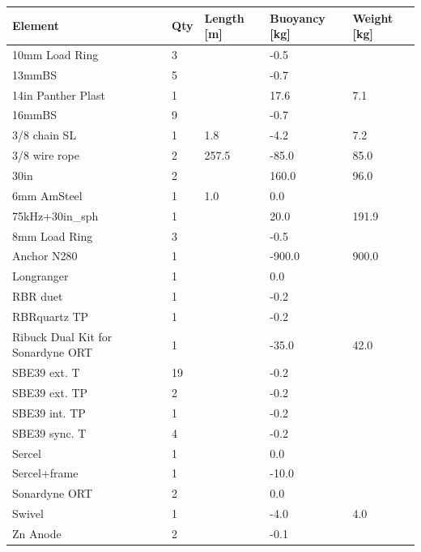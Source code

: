 \documentclass{article}
\begin{document}
\begin{tabularx}{\linewidth}{|l|l|l|l|l|}
\caption{N280 \textcolor{red}{$\blacksquare$}: Element summary}\\
\hline
\textbf{Element} & \textbf{Qty} & \textbf{Length [m]} & \textbf{Buoyancy [kg]} & \textbf{Weight [kg]} \\
\hline
10mm Load Ring & 3 &  & -0.5 &  \\ \hline
13mmBS & 5 &  & -0.7 &  \\ \hline
14in Panther Plast & 1 &  & 17.6 & 7.1 \\ \hline
16mmBS & 9 &  & -0.7 &  \\ \hline
3/8 chain SL & 1 & 1.8 & -4.2 & 7.2 \\ \hline
3/8 wire rope & 2 & 257.5 & -85.0 & 85.0 \\ \hline
30in & 2 &  & 160.0 & 96.0 \\ \hline
6mm AmSteel & 1 & 1.0 & 0.0 &  \\ \hline
75kHz+30in\_sph & 1 &  & 20.0 & 191.9 \\ \hline
8mm Load Ring & 3 &  & -0.5 &  \\ \hline
Anchor N280 & 1 &  & -900.0 & 900.0 \\ \hline
Longranger & 1 &  & 0.0 &  \\ \hline
RBR duet & 1 &  & -0.2 &  \\ \hline
RBRquartz TP & 1 &  & -0.2 &  \\ \hline
Ribuck Dual Kit for Sonardyne ORT & 1 &  & -35.0 & 42.0 \\ \hline
SBE39 ext. T & 19 &  & -0.2 &  \\ \hline
SBE39 ext. TP & 2 &  & -0.2 &  \\ \hline
SBE39 int. TP & 1 &  & -0.2 &  \\ \hline
SBE39 sync. T & 4 &  & -0.2 &  \\ \hline
Sercel & 1 &  & 0.0 &  \\ \hline
Sercel+frame & 1 &  & -10.0 &  \\ \hline
Sonardyne ORT & 2 &  & 0.0 &  \\ \hline
Swivel & 1 &  & -4.0 & 4.0 \\ \hline
Zn Anode & 2 &  & -0.1 &  \\ \hline
\end{tabularx}
\end{document}
